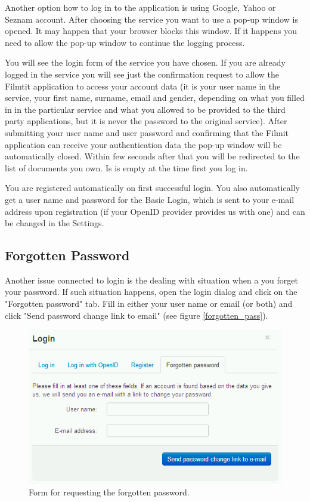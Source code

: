 Another option how to log in to the application is using Google, Yahoo or Seznam account. After choosing the service you want to use a pop-up window is opened. It may happen that your browser blocks this window. If it happens you need to allow the pop-up window to continue the logging process.

You will see the login form of the service you have chosen. If you are already logged in the service you will see just the confirmation request to allow the Filmtit application to access your account data (it is your user name in the service, your first name, surname, email and gender, depending on what you filled in in the particular service and what you allowed to be provided to the third party applications, but it is never the password to the original service). After submitting your user name and user password and confirming that the Filmit application can receive your authentication data the pop-up window will be automatically closed. Within few seconds after that you will be redirected to the list of documents you own. Is is empty at the time first you log in.

You are registered automatically on first successful login. You also automatically get a user name and password for the Basic Login, which is sent to your e-mail address upon registration (if your OpenID provider provides us with one) and can be changed in the Settings.

\subsection{Forgotten Password}

Another issue connected to login is the dealing with situation when a you forget your password. If such situation happens, open the login dialog and click on the "Forgotten password" tab. Fill in either your user name or email (or both) and click "Send password change link to email" (see figure \ref{forgotten_pass}).

\begin{figure}[h]
\begin{center}
\includegraphics[scale=0.4]{figures/user_manual/forgotten_password.png}
\end{center}
\caption{Form for requesting the forgotten password.}
\label{fig:forgotten_pass}
\end{figure}


